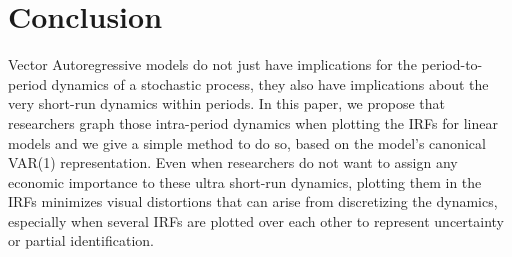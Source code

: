 \documentclass[AER,reviewmode]{tex/AEA}
\begin{document}
\section{Conclusion}
\label{S4}

\noindent%
Vector Autoregressive models do not just have implications for the
period-to-period dynamics of a stochastic process, they also have
implications about the very short-run dynamics within periods. In this
paper, we propose that researchers graph those intra-period dynamics
when plotting the IRFs for linear models and we give a simple method
to do so, based on the model's canonical VAR(1) representation. Even
when researchers do not want to assign any economic importance to
these ultra short-run dynamics, plotting them in the IRFs minimizes
visual distortions that can arise from discretizing the dynamics,
especially when several IRFs are plotted over each other to
represent uncertainty or partial identification.


\end{document}
